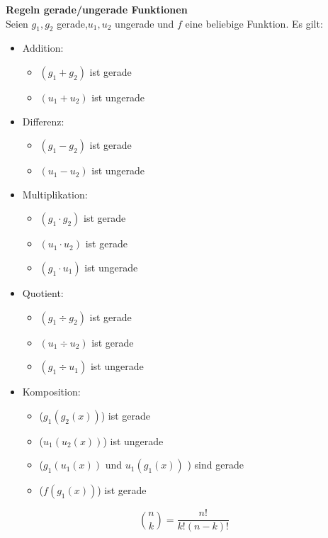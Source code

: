 \documentclass[a4paper,10pt]{article}
\begin{document}
				\newpage
				\noindent
				\textbf{Regeln gerade/ungerade Funktionen}\\
				Seien $g_1,g_2$ gerade,$u_1,u_2$ ungerade und $f$ eine beliebige Funktion.  Es gilt:
				\begin{itemize}
					\item Addition:
					      \begin{itemize}
					      	\item $(g_1+g_2)$ ist gerade
					      	\item $(u_1+u_2)$ ist ungerade
					      \end{itemize}
					\item Differenz:
					      \begin{itemize}
					      	\item $(g_1-g_2)$ ist gerade
					      	\item $(u_1-u_2)$ ist ungerade
					      \end{itemize}
					\item Multiplikation:
					      \begin{itemize}
					      	\item $(g_1 \cdot g_2)$ ist gerade
					      	\item $(u_1 \cdot u_2)$ ist gerade
					      	\item $(g_1 \cdot u_1)$ ist ungerade
					      \end{itemize}
					\item Quotient:
					      \begin{itemize}
					      	\item $(g_1 \div g_2)$ ist gerade
					      	\item $(u_1 \div u_2)$ ist gerade
					      	\item $(g_1 \div u_1)$ ist ungerade
					      \end{itemize}
					\item Komposition:
					      \begin{itemize}
					      	\item ($ g_1(g_2(x)) $) ist gerade 
					      	\item ($ u_1(u_2(x)) $) ist ungerade 
					      	\item ($ g_1(u_1(x))$ und $ u_1(g_1(x)) $ ) sind gerade 
					      	\item ($ f(g_1(x)) $) ist gerade 
					      \end{itemize}
				\end{itemize}
				
				$$\binom{n}{k}=\frac{n!}{k!(n - k)!}$$
\end{document}

